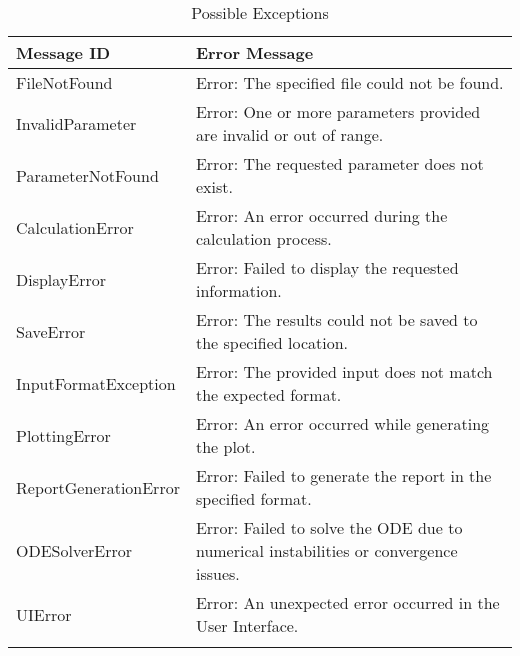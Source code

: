 \documentclass[12pt, titlepage]{article}
\begin{document}
\begin{longtable}{l p{12cm}}
  \toprule
  \textbf{Message ID} & \textbf{Error Message} \\
  \midrule
  FileNotFound & Error: The specified file could not be found. \\
  InvalidParameter & Error: One or more parameters provided are invalid or out of range. \\
  ParameterNotFound& Error: The requested parameter does not exist.\\
  CalculationError& Error: An error occurred during the calculation process.\\
  DisplayError& Error: Failed to display the requested information.\\
  SaveError& Error: The results could not be saved to the specified location.\\
  InputFormatException& Error: The provided input does not match the expected format.\\
  PlottingError& Error: An error occurred while generating the plot.\\
  ReportGenerationError& Error: Failed to generate the report in the specified format.\\
  ODESolverError& Error: Failed to solve the ODE due to numerical instabilities or convergence issues.\\
  UIError& Error: An unexpected error occurred in the User Interface.\\
  \bottomrule
  \caption{Possible Exceptions} \\
\end{longtable}
\end{document}

